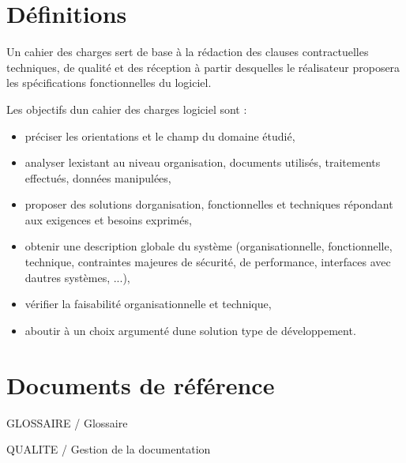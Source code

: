 \documentclass{mise_en_page}
\begin{document}
\maketitle

\begin{historique}
\end{historique}

\newpage

\tableofcontents

\section[Définitions]{Définitions}
Un cahier des charges sert de base à la rédaction des clauses
contractuelles techniques, de qualité et des réception à partir
desquelles le réalisateur proposera les spécifications fonctionnelles
du logiciel.

Les objectifs d{\textquotesingle}un cahier des charges logiciel sont :

\begin{itemize}
\item préciser les orientations et le champ du domaine étudié,
\item analyser l{\textquotesingle}existant au niveau organisation,
documents utilisés, traitements effectués, données manipulées,
\item proposer des solutions d{\textquotesingle}organisation,
fonctionnelles et techniques répondant aux exigences et besoins
exprimés,
\item obtenir une description globale du système (organisationnelle,
fonctionnelle, technique, contraintes majeures de sécurité, de
performance, interfaces avec d{\textquotesingle}autres systèmes, ...),
\item vérifier la faisabilité organisationnelle et technique,
\item aboutir à un choix argumenté d{\textquotesingle}une solution type
de développement.
\end{itemize}


\section[Documents de référence]{Documents de référence}
GLOSSAIRE / Glossaire

QUALITE / Gestion de la documentation
\end{document}
